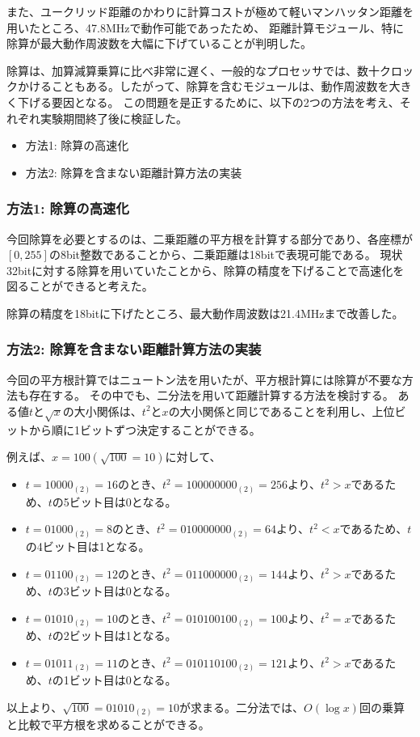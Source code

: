 また、ユークリッド距離のかわりに計算コストが極めて軽いマンハッタン距離を用いたところ、47.8MHzで動作可能であったため、
距離計算モジュール、特に除算が最大動作周波数を大幅に下げていることが判明した。

除算は、加算減算乗算に比べ非常に遅く、一般的なプロセッサでは、数十クロックかけることもある。したがって、除算を含むモジュールは、動作周波数を大きく下げる要因となる。
この問題を是正するために、以下の2つの方法を考え、それぞれ実験期間終了後に検証した。
\begin{itemize}
    \item 方法1: 除算の高速化
    \item 方法2: 除算を含まない距離計算方法の実装
\end{itemize}
\subsubsection{方法1: 除算の高速化}
今回除算を必要とするのは、二乗距離の平方根を計算する部分であり、各座標が$[0,255]$の8bit整数であることから、二乗距離は18bitで表現可能である。
現状32bitに対する除算を用いていたことから、除算の精度を下げることで高速化を図ることができると考えた。

除算の精度を18bitに下げたところ、最大動作周波数は21.4MHzまで改善した。

\subsubsection{方法2: 除算を含まない距離計算方法の実装}
今回の平方根計算ではニュートン法を用いたが、平方根計算には除算が不要な方法も存在する。
その中でも、二分法を用いて距離計算する方法を検討する。
ある値$t$と$\sqrt{x}$の大小関係は、$t^2$と$x$の大小関係と同じであることを利用し、上位ビットから順に1ビットずつ決定することができる。

例えば、$x=100 (\sqrt{100}=10)$に対して、
\begin{itemize}
    \item $t=10000_{(2)}=16$のとき、$t^2=100000000_{(2)}=256$より、$t^2>x$であるため、$t$の5ビット目は0となる。
    \item $t=01000_{(2)}=8$のとき、$t^2=010000000_{(2)}=64$より、$t^2<x$であるため、$t$の4ビット目は1となる。
    \item $t=01100_{(2)}=12$のとき、$t^2=011000000_{(2)}=144$より、$t^2>x$であるため、$t$の3ビット目は0となる。
    \item $t=01010_{(2)}=10$のとき、$t^2=010100100_{(2)}=100$より、$t^2=x$であるため、$t$の2ビット目は1となる。
    \item $t=01011_{(2)}=11$のとき、$t^2=010110100_{(2)}=121$より、$t^2>x$であるため、$t$の1ビット目は0となる。
\end{itemize}
以上より、$\sqrt{100}=01010_{(2)}=10$が求まる。二分法では、$O(\log x)$回の乗算と比較で平方根を求めることができる。

